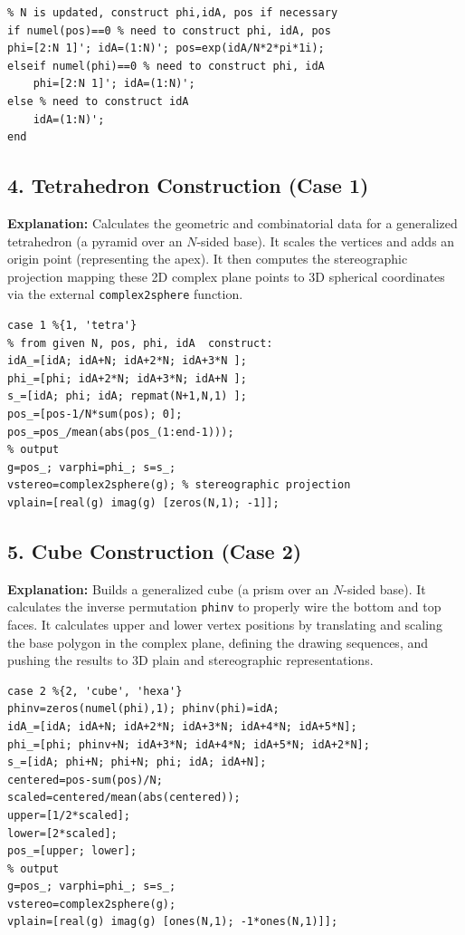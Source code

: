\begin{lstlisting}
% N is updated, construct phi,idA, pos if necessary
if numel(pos)==0 % need to construct phi, idA, pos
phi=[2:N 1]'; idA=(1:N)'; pos=exp(idA/N*2*pi*1i); 
elseif numel(phi)==0 % need to construct phi, idA
    phi=[2:N 1]'; idA=(1:N)'; 
else % need to construct idA
    idA=(1:N)';
end
\end{lstlisting}

\subsection{4. Tetrahedron Construction (Case 1)}
\textbf{Explanation:} 
Calculates the geometric and combinatorial data for a generalized tetrahedron (a pyramid over an $N$-sided base). It scales the vertices and adds an origin point (representing the apex). It then computes the stereographic projection mapping these 2D complex plane points to 3D spherical coordinates via the external \texttt{complex2sphere} function.

\begin{lstlisting}
case 1 %{1, 'tetra'}
% from given N, pos, phi, idA  construct:
idA_=[idA; idA+N; idA+2*N; idA+3*N ];
phi_=[phi; idA+2*N; idA+3*N; idA+N ];
s_=[idA; phi; idA; repmat(N+1,N,1) ];
pos_=[pos-1/N*sum(pos); 0];
pos_=pos_/mean(abs(pos_(1:end-1)));
% output
g=pos_; varphi=phi_; s=s_;
vstereo=complex2sphere(g); % stereographic projection
vplain=[real(g) imag(g) [zeros(N,1); -1]];
\end{lstlisting}

\subsection{5. Cube Construction (Case 2)}
\textbf{Explanation:} 
Builds a generalized cube (a prism over an $N$-sided base). It calculates the inverse permutation \texttt{phinv} to properly wire the bottom and top faces. It calculates upper and lower vertex positions by translating and scaling the base polygon in the complex plane, defining the drawing sequences, and pushing the results to 3D plain and stereographic representations.

\begin{lstlisting}
case 2 %{2, 'cube', 'hexa'}
phinv=zeros(numel(phi),1); phinv(phi)=idA;
idA_=[idA; idA+N; idA+2*N; idA+3*N; idA+4*N; idA+5*N];
phi_=[phi; phinv+N; idA+3*N; idA+4*N; idA+5*N; idA+2*N];
s_=[idA; phi+N; phi+N; phi; idA; idA+N];
centered=pos-sum(pos)/N;
scaled=centered/mean(abs(centered));
upper=[1/2*scaled];
lower=[2*scaled];
pos_=[upper; lower];
% output
g=pos_; varphi=phi_; s=s_;
vstereo=complex2sphere(g); 
vplain=[real(g) imag(g) [ones(N,1); -1*ones(N,1)]];
\end{lstlisting}


